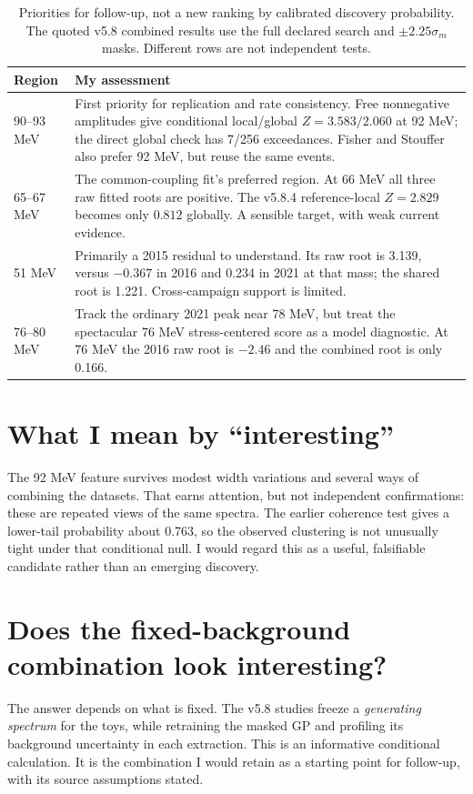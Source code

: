 \documentclass[11pt]{article}
\begin{document}
\begin{table}[h]\centering\small
\begin{tabular}{p{.17\linewidth}p{.75\linewidth}}\toprule
Region & My assessment\\\midrule
90--93 MeV & First priority for replication and rate consistency. Free nonnegative amplitudes give conditional local/global $Z=3.583/2.060$ at 92 MeV; the direct global check has 7/256 exceedances. Fisher and Stouffer also prefer 92 MeV, but reuse the same events.\\[4pt]
65--67 MeV & The common-coupling fit's preferred region. At 66 MeV all three raw fitted roots are positive. The v5.8.4 reference-local $Z=2.829$ becomes only $0.812$ globally. A sensible target, with weak current evidence.\\[4pt]
51 MeV & Primarily a 2015 residual to understand. Its raw root is 3.139, versus $-0.367$ in 2016 and 0.234 in 2021 at that mass; the shared root is 1.221. Cross-campaign support is limited.\\[4pt]
76--80 MeV & Track the ordinary 2021 peak near 78 MeV, but treat the spectacular 76 MeV stress-centered score as a model diagnostic. At 76 MeV the 2016 raw root is $-2.46$ and the combined root is only 0.166.\\\bottomrule
\end{tabular}
\caption{Priorities for follow-up, not a new ranking by calibrated discovery probability. The quoted v5.8 combined results use the full declared search and $\pm2.25\sigma_m$ masks. Different rows are not independent tests.}
\end{table}

\section*{What I mean by ``interesting''}
The 92 MeV feature survives modest width variations and several ways of combining the datasets. That earns attention, but not independent confirmations: these are repeated views of the same spectra. The earlier coherence test gives a lower-tail probability about 0.763, so the observed clustering is not unusually tight under that conditional null. I would regard this as a useful, falsifiable candidate rather than an emerging discovery.

\clearpage
\section*{Does the fixed-background combination look interesting?}
The answer depends on what is fixed. The v5.8 studies freeze a \emph{generating spectrum} for the toys, while retraining the masked GP and profiling its background uncertainty in each extraction. This is an informative conditional calculation. It is the combination I would retain as a starting point for follow-up, with its source assumptions stated.
\end{document}
